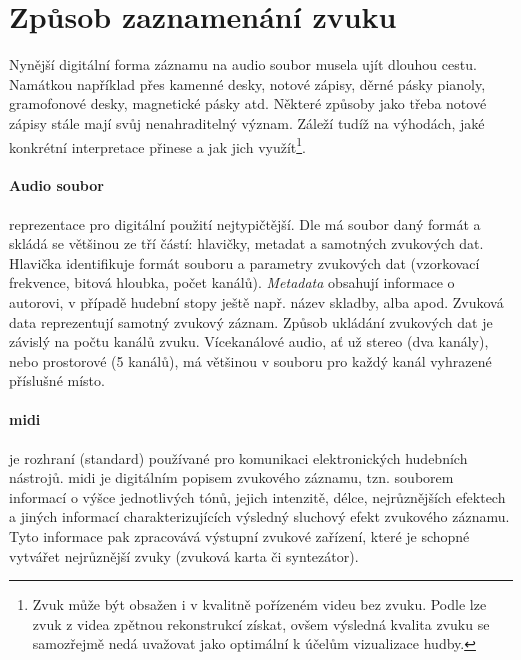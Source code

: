 \documentclass[thesis=B, czech]{FITthesis}[2019/03/06]
\begin{document}
\section{Způsob zaznamenání zvuku}

Nynější digitální forma záznamu na audio soubor musela ujít dlouhou cestu. Namátkou například přes kamenné desky, notové zápisy, děrné pásky pianoly, gramofonové desky, magnetické pásky atd. Některé způsoby jako třeba notové zápisy stále mají svůj nenahraditelný význam. Záleží tudíž na výhodách, jaké konkrétní interpretace přinese a jak jich využít\footnote{Zvuk může být obsažen i v kvalitně pořízeném videu bez zvuku. Podle \cite{visual-microphone} lze zvuk z videa zpětnou rekonstrukcí získat, ovšem výsledná kvalita zvuku se samozřejmě nedá uvažovat jako optimální k účelům vizualizace hudby.}. 


\paragraph*{Audio soubor}



reprezentace pro digitální použití nejtypičtější. Dle \cite{Kabelka4122018} má soubor daný formát a skládá se většinou ze tří částí: hlavičky, metadat a samotných zvukových dat. Hlavička identifikuje formát souboru a parametry zvukových dat (vzorkovací frekvence, bitová hloubka, počet kanálů). \emph{Metadata} obsahují informace o autorovi, v případě hudební stopy ještě např. název skladby, alba apod. {Zvuková data} reprezentují samotný zvukový záznam. Způsob ukládání zvukových dat je závislý na počtu kanálů zvuku. Vícekanálové audio, ať už stereo (dva kanály), nebo prostorové (5 kanálů), má většinou v souboru pro každý kanál vyhrazené příslušné místo. 


\paragraph{\gls{midi}}
%
%
je rozhraní (standard) používané pro komunikaci elektronických hudebních nástrojů. \gls{midi} je digitálním popisem zvukového záznamu, tzn. souborem informací o výšce jednotlivých tónů, jejich intenzitě, délce, nejrůznějších efektech a jiných informací charakterizujících výsledný sluchový efekt zvukového záznamu. Tyto informace pak zpracovává výstupní zvukové zařízení, které je schopné vytvářet nejrůznější zvuky (zvuková karta či syntezátor).
\end{document}
